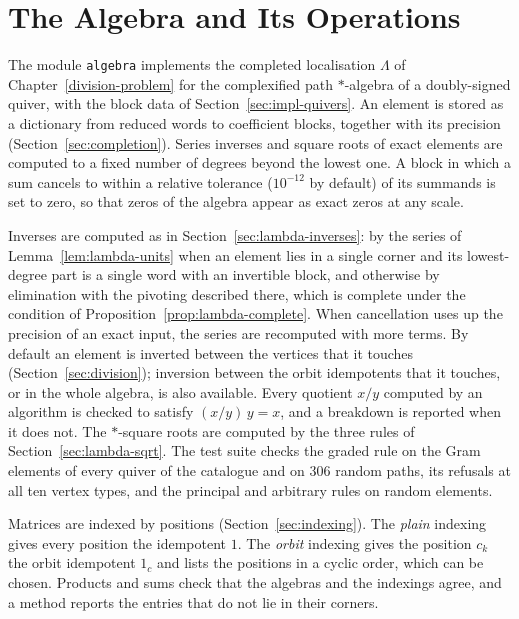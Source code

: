 \documentclass[12pt, a4paper]{report}
\theoremstyle{plain}
\theoremstyle{definition}
\theoremstyle{remark}
\theoremstyle{plain}
\begin{document}
\section{The Algebra and Its Operations}
\label{sec:impl-algebra}
The module \texttt{algebra} implements the completed localisation $\Lambda$ of Chapter~\ref{division-problem} for the complexified path $*$-algebra of a doubly-signed quiver, with the block data of Section~\ref{sec:impl-quivers}. An element is stored as a dictionary from reduced words to coefficient blocks, together with its precision (Section~\ref{sec:completion}). Series inverses and square roots of exact elements are computed to a fixed number of degrees beyond the lowest one. A block in which a sum cancels to within a relative tolerance ($10^{-12}$ by default) of its summands is set to zero, so that zeros of the algebra appear as exact zeros at any scale.

Inverses are computed as in Section~\ref{sec:lambda-inverses}: by the series of Lemma~\ref{lem:lambda-units} when an element lies in a single corner and its lowest-degree part is a single word with an invertible block, and otherwise by elimination with the pivoting described there, which is complete under the condition of Proposition~\ref{prop:lambda-complete}. When cancellation uses up the precision of an exact input, the series are recomputed with more terms. By default an element is inverted between the vertices that it touches (Section~\ref{sec:division}); inversion between the orbit idempotents that it touches, or in the whole algebra, is also available. Every quotient $x/y$ computed by an algorithm is checked to satisfy $(x/y)\,y=x$, and a breakdown is reported when it does not. The $*$-square roots are computed by the three rules of Section~\ref{sec:lambda-sqrt}. The test suite checks the graded rule on the Gram elements of every quiver of the catalogue and on $306$ random paths, its refusals at all ten vertex types, and the principal and arbitrary rules on random elements.

Matrices are indexed by positions (Section~\ref{sec:indexing}). The \emph{plain} indexing gives every position the idempotent $1$. The \emph{orbit} indexing gives the position $c_k$ the orbit idempotent $1_c$ and lists the positions in a cyclic order, which can be chosen. Products and sums check that the algebras and the indexings agree, and a method reports the entries that do not lie in their corners.
\end{document}
